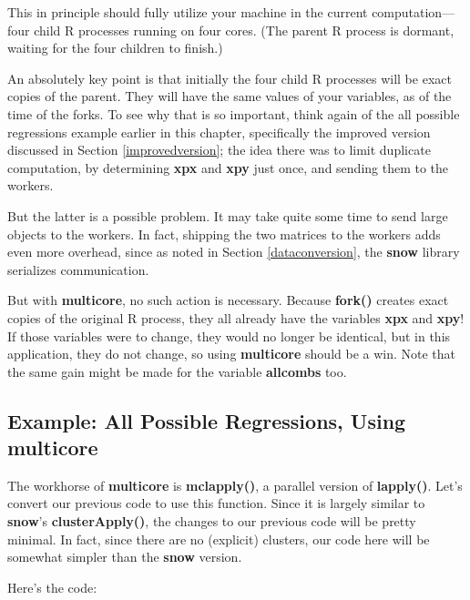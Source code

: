 This in principle should fully utilize your machine in the current
computation---four child R processes running on four cores.  (The parent
R process is dormant, waiting for the four children to finish.)

An absolutely key point is that initially the four child R processes
will be exact copies of the parent.  They will have the same values of
your variables, as of the time of the forks.  To see why that is so
important, think again of the all possible regressions example earlier
in this chapter, specifically the improved version discussed in
Section \ref{improvedversion}; the idea there was to limit duplicate
computation, by determining {\bf xpx} and {\bf xpy} just once, and
sending them to the workers.

But the latter is a possible problem.  It may take quite some time to
send large objects to the workers.  In fact, shipping the two matrices
to the workers adds even more overhead, since as noted in Section
\ref{dataconversion}, the {\bf snow} library serializes communication. 

But with {\bf multicore}, no such action is necessary.  Because {\bf
fork()} creates exact copies of the original R process, they all already
have the variables {\bf xpx} and {\bf xpy}!  If those variables were to
change, they would no longer be identical, but in this application, they
do not change, so using {\bf multicore} should be a win.  Note that the
same gain might be made for the variable {\bf allcombs} too.

\subsection{Example:  All Possible Regressions, Using multicore}

The workhorse of {\bf multicore} is {\bf mclapply()}, a parallel version
of {\bf lapply()}.  Let's convert our previous code to use this
function.  Since it is largely similar to {\bf snow}'s {\bf
clusterApply()}, the changes to our previous code will be pretty
minimal.  In fact, since there are no (explicit) clusters, our code here
will be somewhat simpler than the {\bf snow} version.

Here's the code:

